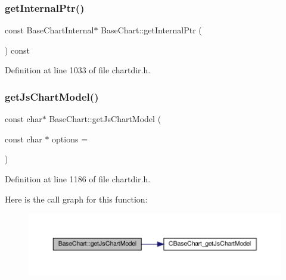 \subsubsection{\texorpdfstring{get\+Internal\+Ptr()}{getInternalPtr()}\hspace{0.1cm}{\footnotesize\ttfamily [2/2]}}
{\footnotesize\ttfamily const Base\+Chart\+Internal$\ast$ Base\+Chart\+::get\+Internal\+Ptr (\begin{DoxyParamCaption}{ }\end{DoxyParamCaption}) const\hspace{0.3cm}{\ttfamily [inline]}}



Definition at line 1033 of file chartdir.\+h.

\mbox{\label{class_base_chart_ab6a378f12f18f5e95084b0e49cc4873f}} 
\subsubsection{\texorpdfstring{get\+Js\+Chart\+Model()}{getJsChartModel()}}
{\footnotesize\ttfamily const char$\ast$ Base\+Chart\+::get\+Js\+Chart\+Model (\begin{DoxyParamCaption}\item[{const char $\ast$}]{options = {} }\end{DoxyParamCaption})\hspace{0.3cm}{\ttfamily [inline]}}



Definition at line 1186 of file chartdir.\+h.

Here is the call graph for this function\+:
\nopagebreak
\begin{figure}[H]
\begin{center}
\leavevmode
\includegraphics[width=350pt]{class_base_chart_ab6a378f12f18f5e95084b0e49cc4873f_cgraph}
\end{center}
\end{figure}
\mbox{\label{class_base_chart_a4e8b4c7a977c3000de134fa58b261a93}} 

